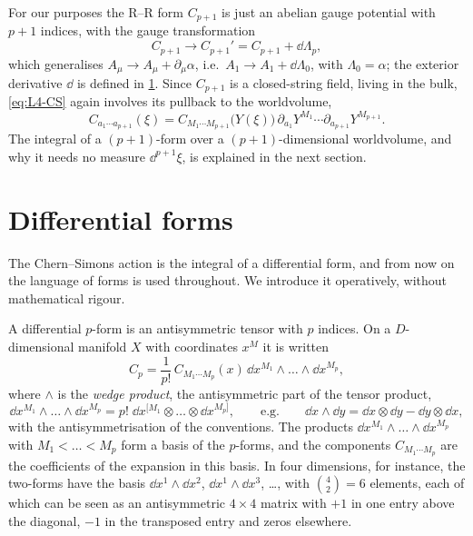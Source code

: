For our purposes the R--R form $C_{p+1}$ is just an abelian gauge potential with $p+1$ indices, with the gauge transformation
\begin{equation}
  C_{p+1}\longrightarrow C_{p+1}' = C_{p+1} + \dd\Lambda_p ,
  \label{eq:L4-gauge-C}
\end{equation}
which generalises $A_\mu\to A_\mu + \partial_\mu\alpha$, i.e.\ $A_1\to A_1 + \dd\Lambda_0$, with $\Lambda_0 = \alpha$; the exterior derivative $\dd$ is defined in \cref{sec:L4-forms}. Since $C_{p+1}$ is a closed-string field, living in the bulk, \cref{eq:L4-CS} again involves its pullback to the worldvolume,
\begin{equation}
  C_{a_1\cdots a_{p+1}}(\xi) = C_{M_1\cdots M_{p+1}}\bigl(Y(\xi)\bigr)\,\partial_{a_1}Y^{M_1}\cdots\partial_{a_{p+1}}Y^{M_{p+1}} .
  \label{eq:L4-pullback-C}
\end{equation}
The integral of a $(p+1)$-form over a $(p+1)$-dimensional worldvolume, and why it needs no measure $\dd^{p+1}\xi$, is explained in the next section.

\section{Differential forms}
\label{sec:L4-forms}

The Chern--Simons action is the integral of a differential form, and from now on the language of forms is used throughout. We introduce it operatively, without mathematical rigour.

A differential $p$-form is an antisymmetric tensor with $p$ indices. On a $D$-dimensional manifold $X$ with coordinates $x^M$ it is written
\begin{equation}
  C_p = \frac{1}{p!}\,C_{M_1\cdots M_p}(x)\,\dd x^{M_1}\wedge\dots\wedge\dd x^{M_p} ,
  \label{eq:L4-form}
\end{equation}
where $\wedge$ is the \emph{wedge product}, the antisymmetric part of the tensor product,
\begin{equation}
  \dd x^{M_1}\wedge\dots\wedge\dd x^{M_p} = p!\;\dd x^{[M_1}\otimes\dots\otimes\dd x^{M_p]} ,
  \qquad\text{e.g.}\qquad
  \dd x\wedge\dd y = \dd x\otimes\dd y - \dd y\otimes\dd x ,
  \label{eq:L4-wedge}
\end{equation}
with the antisymmetrisation of the conventions.
The products $\dd x^{M_1}\wedge\dots\wedge\dd x^{M_p}$ with $M_1<\dots<M_p$ form a basis of the $p$-forms, and the components $C_{M_1\cdots M_p}$ are the coefficients of the expansion in this basis. In four dimensions, for instance, the two-forms have the basis $\dd x^1\wedge\dd x^2$, $\dd x^1\wedge\dd x^3$, \dots, with $\binom42 = 6$ elements, each of which can be seen as an antisymmetric $4\times4$ matrix with $+1$ in one entry above the diagonal, $-1$ in the transposed entry and zeros elsewhere.

